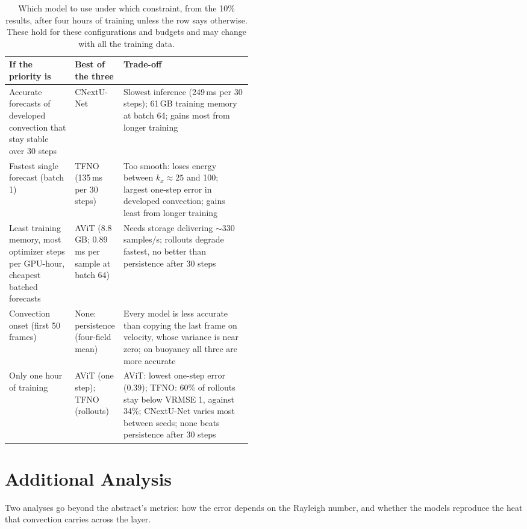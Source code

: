 \documentclass[11pt]{article}
\begin{document}
\begin{table}[!htbp]
\centering\footnotesize
\begin{tabularx}{\linewidth}{@{}>{\raggedright\arraybackslash}p{0.27\linewidth}>{\raggedright\arraybackslash}p{0.2\linewidth}>{\raggedright\arraybackslash}X@{}}
\toprule
If the priority is & Best of the three & Trade-off \\
\midrule
Accurate forecasts of developed convection that stay stable over 30 steps & CNextU-Net & Slowest inference
(249\,ms per 30 steps); 61\,GB training memory at batch 64; gains most from longer training \\ \addlinespace[3pt]
Fastest single forecast (batch 1) & TFNO (135\,ms per 30 steps) & Too smooth: loses energy between $k_x\approx25$
and 100; largest one-step error in developed convection; gains least from longer training \\ \addlinespace[3pt]
Least training memory, most optimizer steps per GPU-hour, cheapest batched forecasts & AViT (8.8\,GB; 0.89\,ms per
sample at batch 64) & Needs storage delivering
$\sim$330 samples/s; rollouts degrade fastest, no better than persistence after 30 steps \\ \addlinespace[3pt]
Convection onset (first 50 frames) & None: persistence (four-field mean) & Every model is less accurate than
copying the last frame on velocity, whose variance is near zero; on buoyancy all three are more accurate \\ \addlinespace[3pt]
Only one hour of training & AViT (one step); TFNO (rollouts) & AViT: lowest one-step error (0.39);
TFNO: 60\% of rollouts stay below VRMSE 1, against 34\%; CNextU-Net varies most between seeds; none beats
persistence after 30 steps \\
\bottomrule
\end{tabularx}
\caption{Which model to use under which constraint, from the 10\% results, after four hours of training unless
the row says otherwise. These hold for these configurations and budgets and may change with all the training data.}
\label{tab:choice}
\end{table}

\FloatBarrier
\section{Additional Analysis}
\label{sec:extra}

Two analyses go beyond the abstract's metrics: how the error depends on the Rayleigh number, and whether the models
reproduce the heat that convection carries across the layer.
\end{document}

